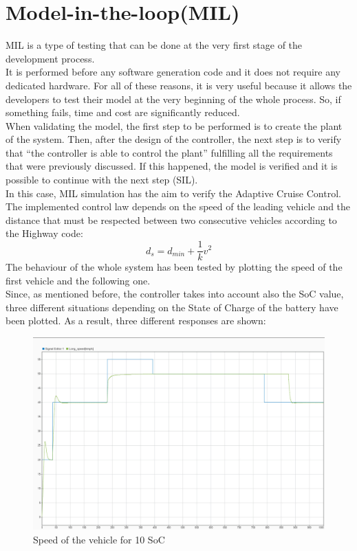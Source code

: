 \documentclass[12pt,a4paper]{report}
\begin{document}
\section{Model-in-the-loop(MIL)}
MIL is a type of testing that can be done at the very first stage of the development process.\\
It is performed before any software generation code and it does not require any dedicated hardware. For all of these reasons, it is very useful because it allows the developers to test their model at the very beginning of the whole process. So, if something fails, time and cost are significantly reduced. \\
When validating the model, the first step to be performed is to create the plant of the system. Then, after the design of the controller, the next step is to verify that “the controller is able to control the plant” fulfilling all the requirements that were previously discussed. If this happened, the model is verified and it is possible to continue with the next step (SIL).\\
In this case, MIL simulation has the aim to verify the Adaptive Cruise Control. \\
The implemented control law  depends on the speed of the leading vehicle and the distance that must be respected between two consecutive vehicles according to the Highway code:\\
\begin{equation*}
	d_s=d_{min}+\dfrac{1}{k}v^2
\end{equation*}
The behaviour of the whole system has been tested by plotting the speed of the first vehicle and the following one.\\
Since, as mentioned before, the controller takes into account also the SoC value, three different situations depending on the State of Charge of the battery have been plotted. As a result, three different responses are shown:\\
\begin{figure}[htbp]
	\centering
	\includegraphics[scale=0.2]{10_soc.jpeg}
	\caption{Speed of the vehicle for 10 SoC}
\end{figure}
\end{document}
